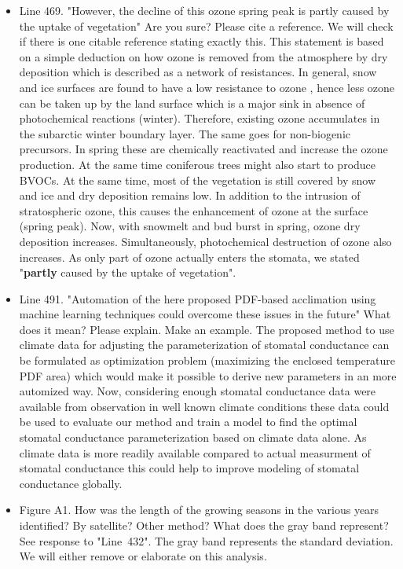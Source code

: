 \documentclass{scrartcl}
\begin{document}
\begin{itemize}
\item {\color{blue}Line 469. "However, the decline of this ozone spring peak is partly caused by the uptake of vegetation" Are you sure? Please cite a reference.}
We will check if there is one citable reference stating exactly this. This statement is based on a simple deduction on how ozone is removed from the atmosphere by dry deposition which is described as a network of resistances. In general, snow and ice surfaces are found to have a low resistance to ozone , hence less ozone can be taken up by the land surface which is a major sink in absence of photochemical reactions (winter). Therefore, existing ozone accumulates in the subarctic winter boundary layer. The same goes for non-biogenic precursors. In spring these are chemically reactivated and increase the ozone production. At the same time coniferous trees might also start to produce BVOCs. At the same time, most of the vegetation is still covered by snow and ice and dry deposition remains low. In addition to the intrusion of stratospheric ozone, this causes the enhancement of ozone at the surface (spring peak). Now, with snowmelt and bud burst in spring, ozone dry deposition increases. Simultaneously, photochemical destruction of ozone also increases. As only part of ozone actually enters the stomata, we stated "\textbf{partly} caused by the uptake of vegetation".

\item {\color{blue}Line 491. "Automation of the here proposed PDF-based acclimation using machine learning techniques could overcome these issues in the future"
What does it mean? Please explain. Make an example.}
The proposed method to use climate data for adjusting the parameterization of stomatal conductance can be formulated as optimization problem (maximizing the enclosed temperature PDF area) which would make it possible to derive new parameters in an more automized way. 
Now, considering enough stomatal conductance data were available from observation in well known climate conditions these data could be used to evaluate our method and train a model to find the optimal stomatal conductance parameterization based on climate data alone. As climate data is more readily available compared to actual measurment of stomatal conductance this could help to improve modeling of stomatal conductance globally.

\item {\color{blue}Figure A1. How was the length of the growing seasons in the various years identified? By satellite? Other method? What does the gray band represent?} See response to "Line~432". The gray band represents the standard deviation. We will either remove or elaborate on this analysis.


\end{itemize}
\end{document}

